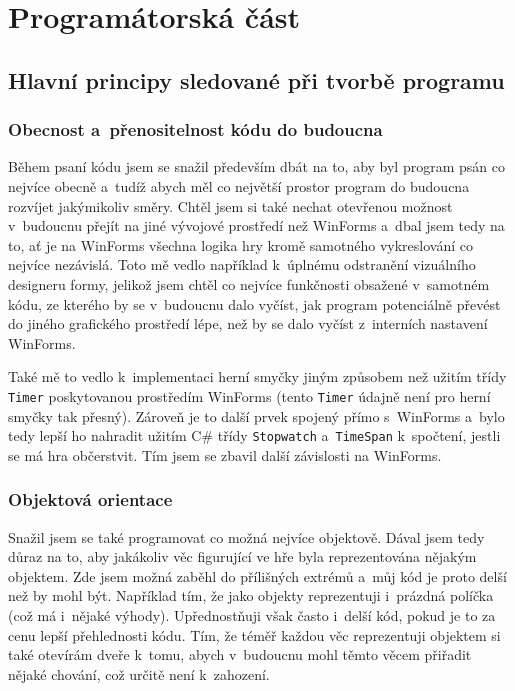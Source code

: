 \documentclass[a4]{article}
\begin{document}
\section{Programátorská část}
\subsection{Hlavní principy sledované při tvorbě programu}

\subsubsection{Obecnost a~přenositelnost kódu do budoucna}
Během psaní kódu jsem se snažil především dbát na to, aby byl program psán co nejvíce obecně a~tudíž abych měl co největší prostor program do budoucna rozvíjet jakýmikoliv směry. Chtěl jsem si také nechat otevřenou možnost v~budoucnu přejít na jiné vývojové prostředí než WinForms a~dbal jsem tedy na to, ať je na WinForms všechna logika hry kromě samotného vykreslování co nejvíce nezávislá. Toto mě vedlo například k~úplnému odstranění vizuálního designeru formy, jelikož jsem chtěl co nejvíce funkčnosti obsažené v~samotném kódu, ze kterého by se v~budoucnu dalo vyčíst, jak program potenciálně převést do jiného grafického prostředí lépe, než by se dalo vyčíst z~interních nastavení WinForms.

Také mě to vedlo k~implementaci herní smyčky jiným způsobem než užitím třídy \verb|Timer| poskytovanou prostředím WinForms (tento \verb|Timer| údajně není pro herní smyčky tak přesný). Zároveň je to další prvek spojený přímo s~WinForms a~bylo tedy lepší ho nahradit užitím C\# třídy \verb|Stopwatch| a~\verb|TimeSpan| k~spočtení, jestli se má hra občerstvit. Tím jsem se zbavil další závislosti na WinForms.

\subsubsection{Objektová orientace}
Snažil jsem se také programovat co možná nejvíce objektově. Dával jsem tedy důraz na to, aby jakákoliv věc figurující ve hře byla reprezentována nějakým objektem. Zde jsem možná zaběhl do přílišných extrémů a~můj kód je proto delší než by mohl být. Například tím, že jako objekty reprezentuji i~prázdná políčka (což má i~nějaké výhody). Upřednostňuji však často i~delší kód, pokud je to za cenu lepší přehlednosti kódu. Tím, že téměř každou věc reprezentuji objektem si také otevírám dveře k~tomu, abych v~budoucnu mohl těmto věcem přiřadit nějaké chování, což určitě není k~zahození.
\end{document}
